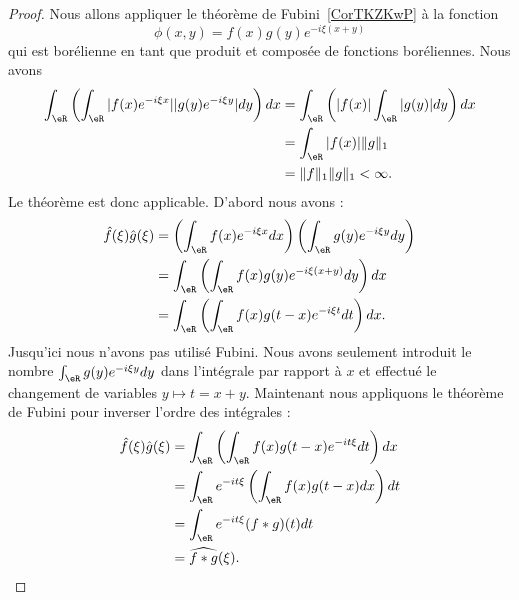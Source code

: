 \begin{proof}
	Nous allons appliquer le théorème de Fubini~\ref{CorTKZKwP} à la fonction
	\begin{equation}
		\phi(x,y)=f(x)g(y) e^{-i\xi(x+y)}
	\end{equation}
	qui est borélienne en tant que produit et composée de fonctions boréliennes. Nous avons
	\begin{subequations}
		\begin{align}
			\int_{\eR}\left( \int_{\eR}| f(x) e^{-i\xi x} | |g(y) e^{-i\xi y} |dy \right)dx & =\int_{\eR}\left( | f(x) |\int_{\eR}| g(y) |dy \right)dx \\
			                                                                                & =\int_{\eR}| f(x) |\| g \|_1                             \\
			                                                                                & =\| f \|_1\| g \|_1<\infty.
		\end{align}
	\end{subequations}
	Le théorème est donc applicable. D'abord nous avons :
	\begin{subequations}
		\begin{align}
			\hat f(\xi)\hat g(\xi) & =\left(\int_{\eR}f(x) e^{-i\xi x}dx\right)\left(\int_{\eR}g(y) e^{-i\xi y}dy\right) \\
			                       & =\int_{\eR}\left( \int_{\eR}f(x)g(y) e^{-i\xi(x+y)}dy \right)dx                     \\
			                       & =\int_{\eR}\left( \int_{\eR}f(x)g(t-x) e^{-i\xi t}dt \right)dx.
		\end{align}
	\end{subequations}
	Jusqu'ici nous n'avons pas utilisé Fubini. Nous avons seulement introduit le nombre \( \int_{\eR}g(y) e^{-i\xi y}dy\) dans l'intégrale par rapport à \( x\) et effectué le changement de variables \( y\mapsto t=x+y\). Maintenant nous appliquons le théorème de Fubini pour inverser l'ordre des intégrales :
	\begin{subequations}
		\begin{align}
			\hat f(\xi)\hat g(\xi) & =\int_{\eR}\left( \int_{\eR}f(x)g(t-x) e^{-it\xi}dt \right)dx \\
			                       & =\int_{\eR} e^{-it\xi}\left( \int_{\eR}f(x)g(t-x)dx \right)dt \\
			                       & =\int_{\eR} e^{-it\xi}(f*g)(t)dt                              \\
			                       & =\widehat{f*g}(\xi).
		\end{align}
	\end{subequations}
\end{proof}

